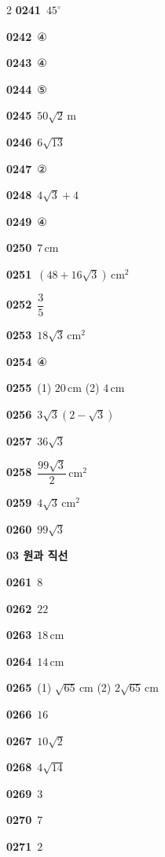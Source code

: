 \documentclass[10pt,a4paper]{article}
\begin{document}
\begin{multicols}{2}
\noindent\textbf{0241}\ $45^\circ$\par
\noindent\textbf{0242}\ ④\par
\noindent\textbf{0243}\ ④\par
\noindent\textbf{0244}\ ⑤\par
\noindent\textbf{0245}\ $50\sqrt{2}\,\mathrm{m}$\par
\noindent\textbf{0246}\ $6\sqrt{13}$\par
\noindent\textbf{0247}\ ②\par
\noindent\textbf{0248}\ $4\sqrt{3}+4$\par
\noindent\textbf{0249}\ ④\par
\noindent\textbf{0250}\ $7\,\mathrm{cm}$\par
\noindent\textbf{0251}\ $(48+16\sqrt{3})\,\mathrm{cm}^2$\par
\noindent\textbf{0252}\ $\dfrac{3}{5}$\par
\noindent\textbf{0253}\ $18\sqrt{3}\,\mathrm{cm}^2$\par
\noindent\textbf{0254}\ ④\par
\noindent\textbf{0255}\ (1) $20\,\mathrm{cm}$ (2) $4\,\mathrm{cm}$\par
\noindent\textbf{0256}\ $3\sqrt{3}(2-\sqrt{3})$\par
\noindent\textbf{0257}\ $36\sqrt{3}$\par
\noindent\textbf{0258}\ $\dfrac{99\sqrt{3}}{2}\,\mathrm{cm}^2$\par
\noindent\textbf{0259}\ $4\sqrt{3}\,\mathrm{cm}^2$\par
\noindent\textbf{0260}\ $99\sqrt{3}$\par
\noindent\textbf{03 원과 직선}\par\smallskip
\noindent\textbf{0261}\ $8$\par
\noindent\textbf{0262}\ $22$\par
\noindent\textbf{0263}\ $18\,\mathrm{cm}$\par
\noindent\textbf{0264}\ $14\,\mathrm{cm}$\par
\noindent\textbf{0265}\ (1) $\sqrt{65}\,\mathrm{cm}$ (2) $2\sqrt{65}\,\mathrm{cm}$\par
\noindent\textbf{0266}\ $16$\par
\noindent\textbf{0267}\ $10\sqrt{2}$\par
\noindent\textbf{0268}\ $4\sqrt{14}$\par
\noindent\textbf{0269}\ $3$\par
\noindent\textbf{0270}\ $7$\par
\noindent\textbf{0271}\ $2$\par

\end{multicols}
\end{document}
